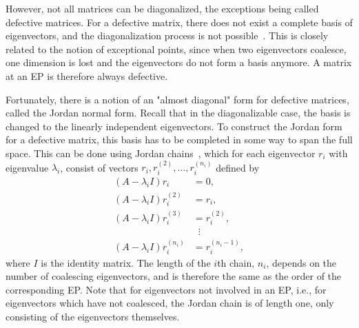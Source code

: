 \documentclass[../main.tex]{subfiles}
\begin{document}
However, not all matrices can be diagonalized, the exceptions being called defective matrices. For a defective matrix, there does not exist a complete basis of eigenvectors, and the diagonalization process is not possible~\cite{uffe}. This is closely related to the notion of exceptional points, since when two eigenvectors coalesce, one dimension is lost and the eigenvectors do not form a basis anymore. A matrix at an EP is therefore always defective.

Fortunately, there is a notion of an "almost diagonal" form for defective matrices, called the Jordan normal form. Recall that in the diagonalizable case, the basis is changed to the linearly independent eigenvectors. To construct the Jordan form for a defective matrix, this basis has to be completed in some way to span the full space. This can be done using Jordan chains~\cite{uffe}, which for each eigenvector $r_i$ with eigenvalue $\lambda_i$, consist of vectors $r_i, r_i^{(2)}, \dots,   r_i^{(n_i)}$ defined by
\begin{equation}\label{jordanchain}
\begin{aligned}
    (A-\lambda_iI)r_i &= 0, \\
    (A-\lambda_iI)r_i^{(2)} &= r_i, \\
    (A-\lambda_iI)r_i^{(3)} &= r_i^{(2)}, \\
    &\;\;\vdots \\
    (A-\lambda_iI)r_i^{(n_i)} &= r_i^{(n_i-1)},
\end{aligned}
\end{equation}
where $I$ is the identity matrix. The length of the $i$th chain, $n_i$, depends on the number of coalescing eigenvectors, and is therefore the same as the order of the corresponding EP. Note that for eigenvectors not involved in an EP, i.e., for eigenvectors which have not coalesced, the Jordan chain is of length one, only consisting of the eigenvectors themselves.
\end{document}
